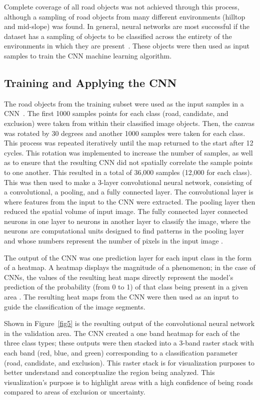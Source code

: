 \documentclass[remotesensing,article,accept,pdftex,moreauthors]{Definitions/mdpi}
\begin{document}
Complete coverage of all road objects was not achieved through this process, although a sampling of road objects from many different environments (hilltop and mid-slope) was found.  In general, neural networks are most successful if the dataset has a sampling of objects to be classified across the entirety of the environments in which they are present~\cite{prakash}. These objects were then used as input samples to train the CNN machine learning algorithm.  

\subsection{Training and Applying the CNN}
The road objects from the training subset were used as the input samples in a CNN~\cite{ecogcnn}. The first 1000 samples points for each class (road, candidate, and exclusion) were taken from within their classified image objects. Then, the canvas was rotated by 30 degrees and another 1000 samples were taken for each class. This process was repeated iteratively until the map returned to the start after 12 cycles. This rotation was implemented to increase the number of samples, as well as to ensure that the resulting CNN did not spatially correlate the sample points to one another. This resulted in a total of 36,000 samples (12,000 for each class). This was then used to make a 3-layer convolutional neural network, consisting of a convolutional, a pooling, and a fully connected layer. The convolutional layer is where features from the input to the CNN were extracted. The pooling layer then reduced the spatial volume of input image. The fully connected layer connected neurons in one layer to neurons in another layer to classify the image, where the neurons are computational units designed to find patterns in the pooling layer and whose numbers represent the number of pixels in the input image \cite{prakash}.

The output of the CNN was one prediction layer for each input class in the form of a heatmap. A heatmap displays the magnitude of a phenomenon; in the case of CNNs, the values of the resulting heat maps directly represent the model’s prediction of the probability (from 0 to 1) of that class being present in a given area \cite{prakash, timilsina}. The resulting heat maps from the CNN were then used as an input to guide the classification of the image segments.
 
Shown in Figure~\ref{fig5} is the resulting output of the convolutional neural network in the validation area. The CNN created a one band heatmap for each of the three class types; these outputs were then stacked into a 3-band raster stack with each band (red, blue, and green) corresponding to a classification parameter (road, candidate, and exclusion). This raster stack is for visualization purposes to better understand and conceptualize the region being analyzed. This visualization’s purpose is to highlight areas with a high confidence of being roads compared to areas of exclusion or uncertainty.
\end{document}
